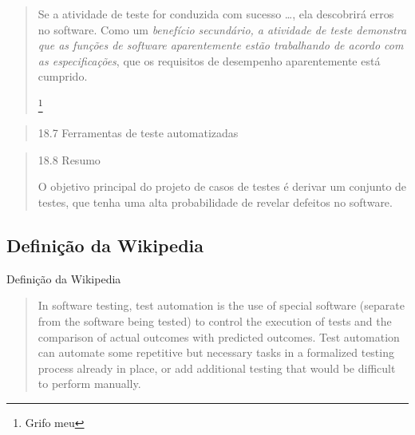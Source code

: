 \documentclass[]{beamer}
\begin{document}
  \begin{frame}{\subsecname}
    \blockquote[{\cite[Pressman]{pressman_engenharia_1995}}]{
      Se a atividade de teste for conduzida com sucesso \ldots, ela descobrirá
      erros no software. Como um \emph{benefício secundário, a atividade de
      teste demonstra que as funções de software aparentemente estão trabalhando de
      acordo com as especificações}, que os requisitos de desempenho aparentemente
      está cumprido.

      \let\thefootnote\relax\footnote{Grifo meu}
    }
  \end{frame}

  \begin{frame}{\subsecname}
    \blockquote[{\cite[Pressman]{pressman_engenharia_1995}}]{
      18.7 Ferramentas de teste automatizadas
    }
  \end{frame}

  \begin{frame}{\subsecname}
    \blockquote[{\cite[Pressman]{pressman_engenharia_1995}}]{
      18.8 Resumo

      O objetivo principal do projeto de casos de testes é derivar um conjunto de
      testes, que tenha uma alta probabilidade de revelar defeitos no software.
    }
  \end{frame}



  \subsection*{Definição da Wikipedia}
  \begin{frame}
    \begin{center}
      \Huge Definição da Wikipedia
    \end{center}
  \end{frame}

  \begin{frame}{\subsecname}
    \blockquote[{\cite[Wikipedia]{_test_2014}}]{
      In software testing, test automation is the use of special software
      (separate from the software being tested) to control the execution of
      tests and the comparison of actual outcomes with predicted outcomes. Test
      automation can automate some repetitive but necessary tasks in a
      formalized testing process already in place, or add additional testing
      that would be difficult to perform manually.
    }
  \end{frame}
\end{document}
